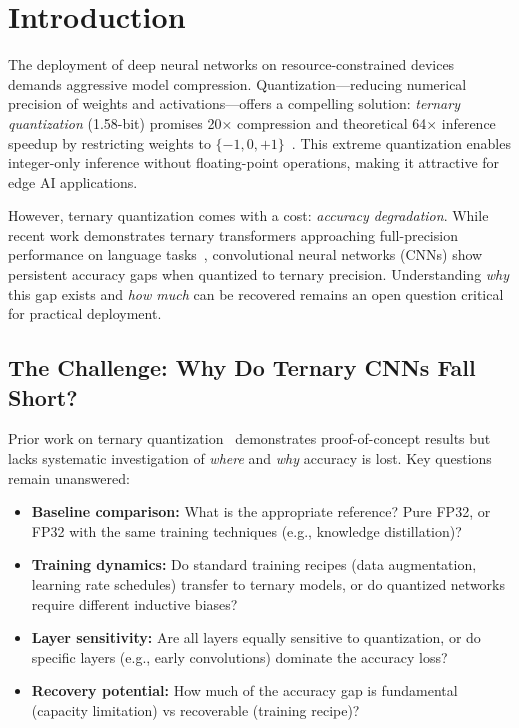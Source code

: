 
\section{Introduction}
\label{sec:introduction}

The deployment of deep neural networks on resource-constrained devices demands aggressive model compression. Quantization—reducing numerical precision of weights and activations—offers a compelling solution: \textit{ternary quantization} (1.58-bit) promises 20× compression and theoretical 64× inference speedup by restricting weights to $\{-1, 0, +1\}$~\cite{ma2024bitnetb158}. This extreme quantization enables integer-only inference without floating-point operations, making it attractive for edge AI applications.

However, ternary quantization comes with a cost: \textit{accuracy degradation}. While recent work demonstrates ternary transformers approaching full-precision performance on language tasks~\cite{wang2023bitnet}, convolutional neural networks (CNNs) show persistent accuracy gaps when quantized to ternary precision. Understanding \textit{why} this gap exists and \textit{how much} can be recovered remains an open question critical for practical deployment.

\subsection{The Challenge: Why Do Ternary CNNs Fall Short?}

Prior work on ternary quantization~\cite{zhu2017ttq, li2016ternary} demonstrates proof-of-concept results but lacks systematic investigation of \textit{where} and \textit{why} accuracy is lost. Key questions remain unanswered:

\begin{itemize}
    \item \textbf{Baseline comparison:} What is the appropriate reference? Pure FP32, or FP32 with the same training techniques (e.g., knowledge distillation)?
    \item \textbf{Training dynamics:} Do standard training recipes (data augmentation, learning rate schedules) transfer to ternary models, or do quantized networks require different inductive biases?
    \item \textbf{Layer sensitivity:} Are all layers equally sensitive to quantization, or do specific layers (e.g., early convolutions) dominate the accuracy loss?
    \item \textbf{Recovery potential:} How much of the accuracy gap is fundamental (capacity limitation) vs recoverable (training recipe)?
\end{itemize}


